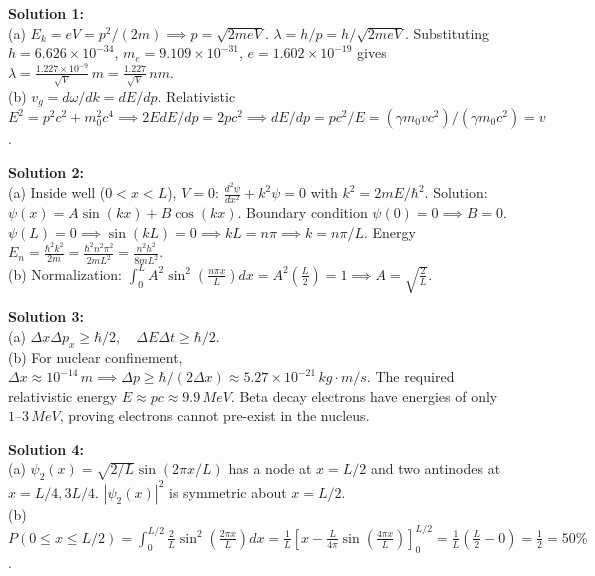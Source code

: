 \begin{solutionbox}
\textbf{Solution 1:}\\
(a) $E_k = eV = p^2/(2m) \implies p = \sqrt{2me V}$. $\lambda = h/p = h/\sqrt{2me V}$. Substituting $h = 6.626 \times 10^{-34}$, $m_e = 9.109 \times 10^{-31}$, $e = 1.602 \times 10^{-19}$ gives $\lambda = \frac{1.227 \times 10^{-9}}{\sqrt{V}}\,\si{m} = \frac{1.227}{\sqrt{V}}\,\si{nm}$.\\
(b) $v_g = d\omega/dk = dE/dp$. Relativistic $E^2 = p^2 c^2 + m_0^2 c^4 \implies 2E dE/dp = 2p c^2 \implies dE/dp = p c^2 / E = (\gamma m_0 v c^2)/(\gamma m_0 c^2) = v$.

\vspace{0.3cm}
\textbf{Solution 2:}\\
(a) Inside well ($0 < x < L$), $V=0$: $\frac{d^2\psi}{dx^2} + k^2\psi = 0$ with $k^2 = 2mE/\hbar^2$. Solution: $\psi(x) = A\sin(kx) + B\cos(kx)$. Boundary condition $\psi(0)=0 \implies B=0$. $\psi(L)=0 \implies \sin(kL)=0 \implies kL = n\pi \implies k = n\pi/L$. Energy $E_n = \frac{\hbar^2 k^2}{2m} = \frac{\hbar^2 n^2\pi^2}{2mL^2} = \frac{n^2 h^2}{8mL^2}$.\\
(b) Normalization: $\int_0^L A^2 \sin^2\left(\frac{n\pi x}{L}\right)dx = A^2\left(\frac{L}{2}\right) = 1 \implies A = \sqrt{\frac{2}{L}}$.

\vspace{0.3cm}
\textbf{Solution 3:}\\
(a) $\Delta x \Delta p_x \ge \hbar/2, \quad \Delta E \Delta t \ge \hbar/2$.\\
(b) For nuclear confinement, $\Delta x \approx 10^{-14}\,\si{m} \implies \Delta p \ge \hbar/(2\Delta x) \approx 5.27 \times 10^{-21}\,\si{kg\cdot m/s}$. The required relativistic energy $E \approx p c \approx 9.9\,\si{MeV}$. Beta decay electrons have energies of only $1\text{--}3\,\si{MeV}$, proving electrons cannot pre-exist in the nucleus.

\vspace{0.3cm}
\textbf{Solution 4:}\\
(a) $\psi_2(x) = \sqrt{2/L}\sin(2\pi x/L)$ has a node at $x = L/2$ and two antinodes at $x = L/4, 3L/4$. $|\psi_2(x)|^2$ is symmetric about $x = L/2$.\\
(b) $P(0 \le x \le L/2) = \int_0^{L/2} \frac{2}{L}\sin^2\left(\frac{2\pi x}{L}\right)dx = \frac{1}{L}\left[ x - \frac{L}{4\pi}\sin\left(\frac{4\pi x}{L}\right) \right]_0^{L/2} = \frac{1}{L}\left(\frac{L}{2} - 0\right) = \frac{1}{2} = 50\%$.
\end{solutionbox}
